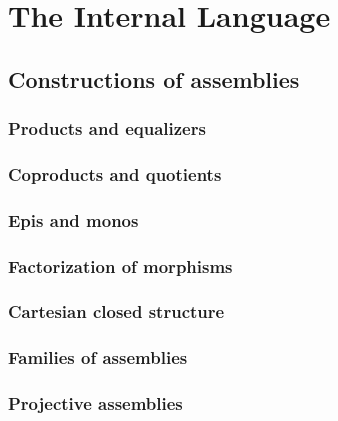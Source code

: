 \chapter{The Internal Language}
\label{chap:internal-language}

\section{Constructions of assemblies}
\label{sec:constructions}

\subsection{Products and equalizers}
\label{sec:products-equalizers}


\subsection{Coproducts and quotients}
\label{sec:products-equalizers}


\subsection{Epis and monos}
\label{sec:epis-monos}


\subsection{Factorization of morphisms}
\label{sec:factorization}


\subsection{Cartesian closed structure}
\label{sec:ccc}

\subsection{Families of assemblies}
\label{sec:dependent-types}




\subsection{Projective assemblies}
\label{sec:projective-assemblies}

